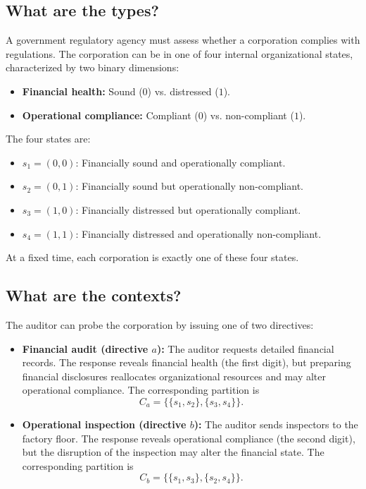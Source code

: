 \documentclass[aps,pra,twocolumn,superscriptaddress,floatfix,longbibliography]{revtex4-2}
\begin{document}
\subsection{What are the types?}

A government regulatory agency must assess whether a corporation
complies with regulations. The corporation can be in one of four
internal organizational states, characterized by two binary dimensions:
\begin{itemize}
\item \textbf{Financial health:} Sound ($0$) vs. distressed ($1$).
\item \textbf{Operational compliance:} Compliant ($0$) vs.
non-compliant ($1$).
\end{itemize}
The four states are:
\begin{itemize}
\item $s_1=(0,0)$: Financially sound and operationally compliant.
\item $s_2=(0,1)$: Financially sound but operationally non-compliant.
\item $s_3=(1,0)$: Financially distressed but operationally compliant.
\item $s_4=(1,1)$: Financially distressed and operationally
non-compliant.
\end{itemize}
At a fixed time, each corporation is exactly one of these four states.

\subsection{What are the contexts?}

The auditor can probe the corporation by issuing one of two directives:
\begin{itemize}
\item \textbf{Financial audit (directive $a$):} The auditor requests
detailed financial records. The response reveals financial health
(the first digit), but preparing financial disclosures reallocates
organizational resources and may alter operational compliance.
The corresponding partition is
\[
C_a=\{\{s_1,s_2\},\{s_3,s_4\}\}.
\]
\item \textbf{Operational inspection (directive $b$):} The auditor
sends inspectors to the factory floor. The response reveals
operational compliance (the second digit), but the disruption of the
inspection may alter the financial state. The corresponding
partition is
\[
C_b=\{\{s_1,s_3\},\{s_2,s_4\}\}.
\]
\end{itemize}
\end{document}
